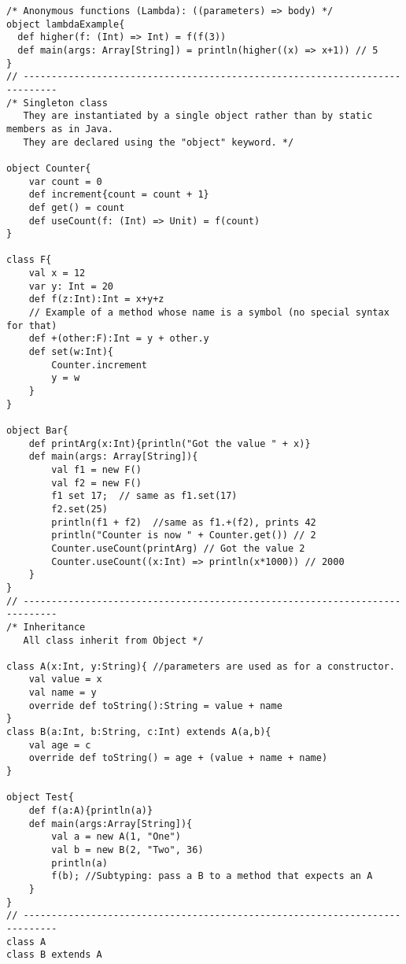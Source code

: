 \documentclass[10pt]{article}
\begin{document}
\begin{verbatim}
/* Anonymous functions (Lambda): ((parameters) => body) */
object lambdaExample{
  def higher(f: (Int) => Int) = f(f(3))  
  def main(args: Array[String]) = println(higher((x) => x+1)) // 5
}
// ----------------------------------------------------------------------------
/* Singleton class
   They are instantiated by a single object rather than by static members as in Java.
   They are declared using the "object" keyword. */

object Counter{
    var count = 0
    def increment{count = count + 1}
    def get() = count
    def useCount(f: (Int) => Unit) = f(count)
}

class F{
    val x = 12
    var y: Int = 20
    def f(z:Int):Int = x+y+z
    // Example of a method whose name is a symbol (no special syntax for that)
    def +(other:F):Int = y + other.y
    def set(w:Int){
        Counter.increment
        y = w
    }
}

object Bar{
    def printArg(x:Int){println("Got the value " + x)}
    def main(args: Array[String]){
        val f1 = new F()
        val f2 = new F()
        f1 set 17;  // same as f1.set(17)        
        f2.set(25)
        println(f1 + f2)  //same as f1.+(f2), prints 42
        println("Counter is now " + Counter.get()) // 2
        Counter.useCount(printArg) // Got the value 2
        Counter.useCount((x:Int) => println(x*1000)) // 2000
    }
}
// ----------------------------------------------------------------------------
/* Inheritance 
   All class inherit from Object */

class A(x:Int, y:String){ //parameters are used as for a constructor.
    val value = x
    val name = y
    override def toString():String = value + name
}
class B(a:Int, b:String, c:Int) extends A(a,b){
    val age = c
    override def toString() = age + (value + name + name)
}

object Test{
    def f(a:A){println(a)}
    def main(args:Array[String]){
        val a = new A(1, "One")
        val b = new B(2, "Two", 36)
        println(a)       
        f(b); //Subtyping: pass a B to a method that expects an A
    }
}
// ----------------------------------------------------------------------------
class A
class B extends A


\end{verbatim}
\end{document}
